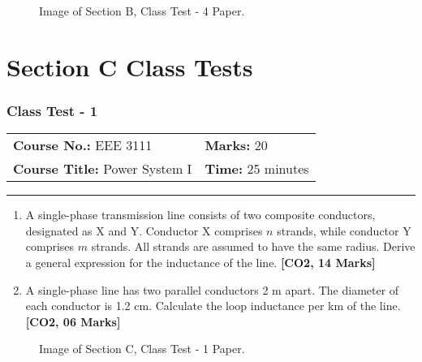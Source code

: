 \documentclass[12pt, a4paper]{article}
\begin{document}
	\begin{figure}[h!]
		\centering
		\caption{Image of Section B, Class Test - 4 Paper.}
	\end{figure}
	\newpage
	
	\part{Section C Class Tests}
	\section{Class Test - 1}
	\begin{tabular}{ll}
		\textbf{Course No.:} EEE 3111 & \textbf{Marks:} 20 \\
		\textbf{Course Title:} Power System I & \textbf{Time:} 25 minutes \\
	\end{tabular}
	\hrule
	\vspace{0.5cm}
	
	\begin{enumerate}[label=\textbf{\arabic*.}]
		\item A single-phase transmission line consists of two composite conductors, designated as X and Y. Conductor X comprises $n$ strands, while conductor Y comprises $m$ strands. All strands are assumed to have the same radius. Derive a general expression for the inductance of the line. \hfill \textbf{[CO2, 14 Marks]}
		\item A single-phase line has two parallel conductors 2 m apart. The diameter of each conductor is 1.2 cm. Calculate the loop inductance per km of the line. \hfill \textbf{[CO2, 06 Marks]}
	\end{enumerate}
	
	\begin{figure}[h!]
		\centering
		\caption{Image of Section C, Class Test - 1 Paper.}
	\end{figure}
	
	\newpage
\end{document}
